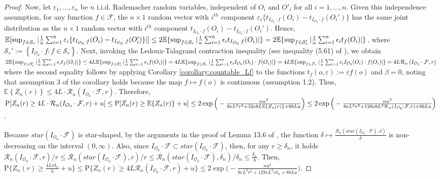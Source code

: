 \documentclass[twoside,11pt]{article}
\newcommand{\E}{\mathbb{E}}
\newcommand{\mc}{\mathcal}
\begin{document}
\begin{proof}
    Now, let $\varepsilon_1,\dots,\varepsilon_n$ be $n$ i.i.d. Rademacher random variables, independent of $O_i$ and $O'_i$ for all $i=1,\dots,n$. Given this independence assumption, for any function $f\in\mc{F}$, the $n \times 1$ random vector with $i^{th}$ component $\varepsilon_i\{t_{I_{\mc{O}_0}\cdot f}(O_i)-t_{I_{\mc{O}_0}\cdot f}(O_i')\}$ has the same joint distribution as the $n \times 1$ random vector with $i^{th}$ component $ t_{I_{\mc{O}_0}\cdot f}(O_i)-t_{I_{\mc{O}_0}\cdot f}(O_i')$.
    Hence, $\E[\sup_{f\in\mc{S}_r}\vert\frac{1}{n}\sum_{i=1}^n\varepsilon_i\{t_{I_{\mc{O}_0}\cdot f}(O_i)-t_{I_{\mc{O}_0}\cdot f}(O_i')\}\vert]\le2\E\{\sup_{f\in\mc{S}_r}\vert\frac{1}{n}\sum_{i=1}^n\epsilon_i t_{I_{\mc{O}_0}\cdot f}(O_i)\vert\}\\=2\E\{\sup_{f\in\mc{S}'_r}\vert\frac{1}{n}\sum_{i=1}^n\epsilon_i  t_f(O_i)\vert\}$.
where $\mc{S}_r':=\left\{I_{\mc{O}_0}\cdot f:f\in\mc{S}_r\right\}$. Next, invoking the Ledoux-Talagrand contraction inequality (see inequality (5.61) of \cite{wainwright2019high}), we obtain $ 2\E\{\sup_{f\in\mc{S}'_r}\vert\frac{1}{n}\sum_{i=1}^n\epsilon_i  t_f(O_i)\vert\}\le
4L\E\{\sup_{f\in\mc{S}'_r}\vert\frac{1}{n}\sum_{i=1}^n\epsilon_i f(O_i)\vert\}\\=4L\E\{\sup_{f\in\mc{S}_r}\vert\frac{1}{n}\sum_{i=1}^n\epsilon_i I_{\mc{O}_0}(O_i)\cdot f(O_i)\vert\}=4L\E\{\sup_{f\in\mc{F}_r}\vert\frac{1}{n}\sum_{i=1}^n\epsilon_i I_{\mc{O}_0}(O_i)\cdot f(O_i)\vert\}=4L \mc{R}_n\left(I_{\mc{O}_0}\cdot\mc{F},r\right)$
    where the second equality follows by applying Corollary \ref{corollary:countable_Lf} to the functions $t_f(o,\varepsilon):=\varepsilon f(o)$ and $\beta=0$, noting that assumption 3 of the corollary holds because the map $f\mapsto f(o)$ is continuous (assumption 1.2). Thus, $\mathbb{E}\left\{Z_n(r)\right\}\le4L\cdot \mc{R}_n\left(I_{\mc{O}_0}\cdot\mc{F},r\right)$. Therefore, $ \text{P}[Z_n(r)\ge 4L\cdot \mc{R}_n(I_{\mc{O}_0}\cdot\mc{F},r)+u]\le \text{P}[Z_n(r)\ge \mathbb{E}\{Z_n(r)\}+u]\\ \le2\exp\Big(-\frac{nu^2}{8eL^2r^2+32ebL\mathbb{E}\left\{Z_n(r)\right\}+8bLu}\Big)\le 2\exp\Big(-\frac{nu^2}{8eL^2r^2+128ebL^2\mc{R}_n(I_{\mc{O}_0}\cdot\mc{F},r)+8bLu}\Big)$.
    
    Because $star\left(I_{\mc{O}_0}\cdot\mc{F}\right)$ is star-shaped, by the arguments in the proof of Lemma 13.6 of \cite{wainwright2019high}, the function $\delta\mapsto\frac{\mc{R}_n\left(star\left(I_{\mc{O}_0}\cdot\mc{F}\right),\delta\right)}{\delta}$ is non-decreasing on the interval $(0,\infty)$. Also, since $I_{\mc{O}_0}\cdot\mc{F}\subset star\left(I_{\mc{O}_0}\cdot\mc{F}\right)$, then, for any $r\ge\delta_n$, it holds $\mc{R}_n\left(I_{\mc{O}_0}\cdot\mc{F},r\right)/r\le\mc{R}_n\left(star\left(I_{\mc{O}_0}\cdot\mc{F}\right),r\right)/r\le\mc{R}_n\left(star\left(I_{\mc{O}_0}\cdot\mc{F}\right),\delta_n\right)/\delta_n\le\frac{\delta_n}{b}$. Then, $\text{P}\{Z_n(r)\ge \frac{4Lr\delta_n}{b}+u\}\le\text{P}\{Z_n(r)\ge 4L \mc{R}_n(I_{\mc{O}_0}\cdot\mc{F},r)+u\}\le 2\exp\Big(-\frac{nu^2}{8eL^2r^2+128eL^2r\delta_n+8bLu}\Big)$.
\end{proof}
\end{document}

